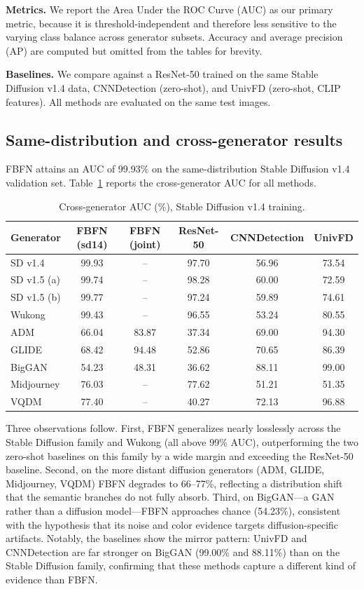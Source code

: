 \documentclass[11pt,a4paper]{article}
\begin{document}
\textbf{Metrics.} We report the Area Under the ROC Curve (AUC) as our primary metric, because it is threshold-independent and therefore less sensitive to the varying class balance across generator subsets. Accuracy and average precision (AP) are computed but omitted from the tables for brevity.

\textbf{Baselines.} We compare against a ResNet-50 trained on the same Stable Diffusion v1.4 data, CNNDetection (zero-shot), and UnivFD (zero-shot, CLIP features). All methods are evaluated on the same test images.

\subsection{Same-distribution and cross-generator results}

FBFN attains an AUC of 99.93\% on the same-distribution Stable Diffusion v1.4 validation set. Table~\ref{tab:cross} reports the cross-generator AUC for all methods.

\begin{table}[h]
\centering
\caption{Cross-generator AUC (\%), Stable Diffusion v1.4 training.}
\label{tab:cross}
\begin{tabular}{lccccc}
\toprule
Generator & FBFN (sd14) & FBFN (joint) & ResNet-50 & CNNDetection & UnivFD \\
\midrule
SD v1.4 & 99.93 & -- & 97.70 & 56.96 & 73.54 \\
SD v1.5 (a) & 99.74 & -- & 98.28 & 60.00 & 72.59 \\
SD v1.5 (b) & 99.77 & -- & 97.24 & 59.89 & 74.61 \\
Wukong & 99.43 & -- & 96.55 & 53.24 & 80.55 \\
ADM & 66.04 & 83.87 & 37.34 & 69.00 & 94.30 \\
GLIDE & 68.42 & 94.48 & 52.86 & 70.65 & 86.39 \\
BigGAN & 54.23 & 48.31 & 36.62 & 88.11 & 99.00 \\
Midjourney & 76.03 & -- & 77.62 & 51.21 & 51.35 \\
VQDM & 77.40 & -- & 40.27 & 72.13 & 96.88 \\
\bottomrule
\end{tabular}
\end{table}

Three observations follow. First, FBFN generalizes nearly losslessly across the Stable Diffusion family and Wukong (all above 99\% AUC), outperforming the two zero-shot baselines on this family by a wide margin and exceeding the ResNet-50 baseline. Second, on the more distant diffusion generators (ADM, GLIDE, Midjourney, VQDM) FBFN degrades to 66--77\%, reflecting a distribution shift that the semantic branches do not fully absorb. Third, on BigGAN---a GAN rather than a diffusion model---FBFN approaches chance (54.23\%), consistent with the hypothesis that its noise and color evidence targets diffusion-specific artifacts. Notably, the baselines show the mirror pattern: UnivFD and CNNDetection are far stronger on BigGAN (99.00\% and 88.11\%) than on the Stable Diffusion family, confirming that these methods capture a different kind of evidence than FBFN.
\end{document}
